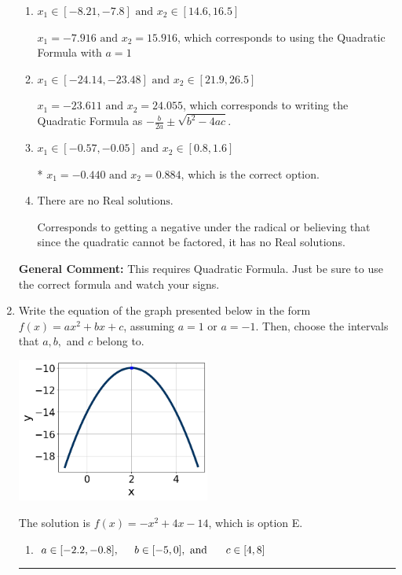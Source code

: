 \documentclass{extbook}[14pt]
\newcommand{\litem}[1]{\item #1

\rule{\textwidth}{0.4pt}}
\begin{document}
\begin{enumerate}
{\begin{enumerate}[label=\Alph*.]
 $x_1 = -0.884 \text{ and } x_2 = 0.440$, which corresponds to writing the Quadratic Formula as $\frac{b \pm \sqrt{b^2 - 4ac}}{2a}$
\item \( x_1 \in [-8.21, -7.8] \text{ and } x_2 \in [14.6, 16.5] \)

 $x_1 = -7.916 \text{ and } x_2 = 15.916$, which corresponds to using the Quadratic Formula with $a=1$
\item \( x_1 \in [-24.14, -23.48] \text{ and } x_2 \in [21.9, 26.5] \)

 $x_1 = -23.611 \text{ and } x_2 = 24.055$, which corresponds to writing the Quadratic Formula as $-\frac{b}{2a} \pm \sqrt{b^2 - 4ac}$.
\item \( x_1 \in [-0.57, -0.05] \text{ and } x_2 \in [0.8, 1.6] \)

* $x_1 = -0.440 \text{ and } x_2 = 0.884$, which is the correct option.
\item \( \text{There are no Real solutions.} \)

Corresponds to getting a negative under the radical or believing that since the quadratic cannot be factored, it has no Real solutions.
\end{enumerate}

\textbf{General Comment:} This requires Quadratic Formula. Just be sure to use the correct formula and watch your signs.
}
\litem{
Write the equation of the graph presented below in the form $f(x)=ax^2+bx+c$, assuming  $a=1$ or $a=-1$. Then, choose the intervals that $a, b,$ and $c$ belong to.

\begin{center}
    \includegraphics[width=0.5\textwidth]{../Figures/quadraticGraphToEquationB.png}
\end{center}



The solution is \( f(x) = -x^{2} +4 x -14 \), which is option E.\begin{enumerate}[label=\Alph*.]
\item \( a \in [-2.2, -0.8], \hspace*{5mm} b \in [-5, 0], \text{ and } \hspace*{5mm} c \in [4, 8] \)


\end{enumerate}}
\end{enumerate}
\end{document}
